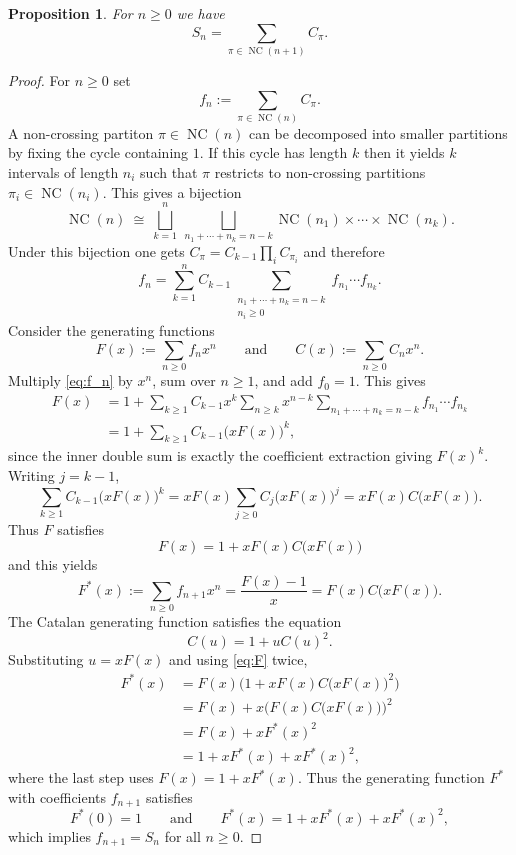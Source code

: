 \documentclass[a4paper]{amsart}
\theoremstyle{plain}
\newtheorem{prop}[thm]{Proposition}
\theoremstyle{definition}
\theoremstyle{remark}
\numberwithin{equation}{section}
\newcommand{\NC}{\operatorname{NC}}
\begin{document}
\begin{prop}\label{pr:Schroeder}
For $n\ge 0$ we have
 \[S_n=\sum_{\pi\in\NC(n+1)}C_\pi.\] 
\end{prop}
\begin{proof}
  For $n\ge 0$ set \[f_n:=\sum_{\pi\in\NC(n)}C_\pi.\] A non-crossing
  partiton $\pi\in\NC(n)$ can be decomposed into smaller partitions by
  fixing the cycle containing $1$.  If this cycle has length $k$ then
  it yields $k$ intervals of length $n_i$ such that $\pi$ restricts to
  non-crossing partitions $\pi_i\in\NC(n_i)$. This gives a bijection
\[  \NC(n)\ \cong\ \bigsqcup_{k=1}^n\ \bigsqcup_{n_1+\cdots+n_k=n-k}
  \NC(n_1)\times\cdots\times \NC(n_k).\] Under this  bijection one gets
$C_\pi=C_{k-1}\prod_i C_{\pi_i}$ and therefore 
\begin{equation}\label{eq:f_n}
  f_n=\sum_{k=1}^n C_{k-1}\sum_{\substack{n_1+\cdots+n_k=n-k\\
      n_i\ge0}} f_{n_1}\cdots f_{n_k}.
\end{equation}
Consider the generating functions
\[F(x):=\sum_{n\ge 0}f_nx^n\qquad\text{and}\qquad
  C(x):=\sum_{n\ge 0}C_nx^n.\]
Multiply \eqref{eq:f_n} by $x^n$, sum over $n\ge1$, and add
$f_0=1$. This gives
\begin{align*}
  F(x)&=1+\sum_{k\ge1}C_{k-1}x^k\sum_{n\ge k}x^{n-k}\sum_{n_1+\cdots+n_k=n-k}f_{n_1}\cdots f_{n_k}\\
      &=1+\sum_{k\ge1}C_{k-1}\big(xF(x)\big)^k,
\end{align*}
since the inner double sum is exactly the coefficient extraction giving $F(x)^k$. Writing $j=k-1$,
\[\sum_{k\ge1}C_{k-1}\big(xF(x)\big)^k=xF(x)\sum_{j\ge0}C_j\big(xF(x)\big)^j=xF(x) C\big(xF(x)\big).\]
Thus $F$ satisfies
\[F(x)=1+xF(x)C\big(xF(x)\big)\] 
and this yields
\begin{equation}\label{eq:F}
  F^*(x):=\sum_{n\ge
    0}f_{n+1}x^n=\frac{F(x)-1}{x}=F(x)C\big(xF(x)\big).
\end{equation}  
The Catalan generating function satisfies the equation \[C(u) = 1 + uC(u)^2.\]
Substituting $u= xF(x)$  and using \eqref{eq:F} twice,
\begin{align*}
  F^*(x) &= F(x)\Big(1 + xF(x) C\big(xF(x)\big)^2\Big)\\
       &= F(x) + x \Big(F(x) C\big(xF(x)\big)\Big)^2\\
       &= F(x) + xF^*(x)^2\\
       &= 1 + xF^*(x) + xF^*(x)^2,
\end{align*}
where the last step uses $F(x) = 1 + xF^*(x)$. Thus the generating
function $F^*$ with coefficients $f_{n+1}$ satisfies
\[F^*(0)=1\qquad\text{and}\qquad F^*(x) = 1 + xF^*(x) + xF^*(x)^2,\]
which implies $f_{n+1}=S_n$ for all $n\ge 0$.
\end{proof}
\end{document}
